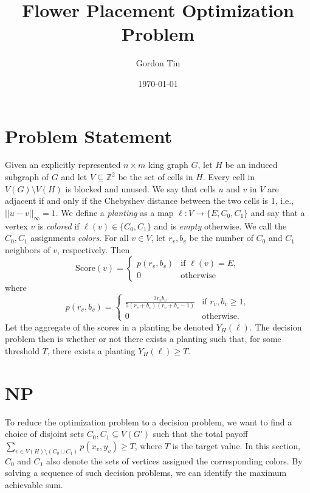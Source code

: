 \documentclass[11pt]{article}
\title{Flower Placement Optimization Problem}
\author{Gordon Tin}
\date{\today}
\theoremstyle{plain}
\begin{document}
\maketitle

\begin{abstract}
\end{abstract}

\section{Problem Statement}

Given an explicitly represented $n \times m$ king graph $G$, let $H$ be an induced subgraph of $G$ and let $V \subseteq \mathbb{Z}^2$ be the set of cells in $H$. Every cell in $V(G) \setminus V(H)$ is blocked and unused. We say that cells $u$ and $v$ in $V$ are adjacent if and only if the Chebyshev distance between the two cells is 1, i.e., $||u-v||_{\infty} = 1$. 
We define a \emph{planting} as a map $\ell: V \to \{E, C_0, C_1\}$ and say that a vertex $v$ is \emph{colored} if $\ell(v) \in \{C_0, C_1\}$ and is \emph{empty} otherwise. We call the $C_0, C_1$ assignments \emph{colors}. For all $v \in V$, let $r_v, b_v$ be the number of $C_0$ and $C_1$ neighbors of $v$, respectively. Then 
\[\mathrm{Score}(v) = \begin{cases}
    p(r_v, b_v) & \text{if } \ell (v) = E, \\
    0  & \text{otherwise}
\end{cases}\]
where 
\[
p(r_v, b_v) = \begin{cases}
    \frac{3 r_v b_v}{5 (r_v + b_v) (r_v + b_v -1)} & \text{if } r_v, b_v \geq 1, \\
    0 & \text{otherwise.}
\end{cases}
\]
Let the aggregate of the scores in a planting be denoted $Y_H(\ell)$. The decision problem then is whether or not there exists a planting such that, for some threshold $T$, there exists a planting $Y_H(\ell) \geq T$.

\section{NP}

To reduce the optimization problem to a decision problem, we want to find a choice of disjoint sets $C_0, C_1 \subseteq V(G')$ such that the total payoff $\sum_{v \in V(H) \setminus (C_0 \cup C_1)} p(x_v, y_v) \geq T$, where $T$ is the target value. In this section, $C_0$ and $C_1$ also denote the sets of vertices assigned the corresponding colors. By solving a sequence of such decision problems, we can identify the maximum achievable sum. 
\end{document}
